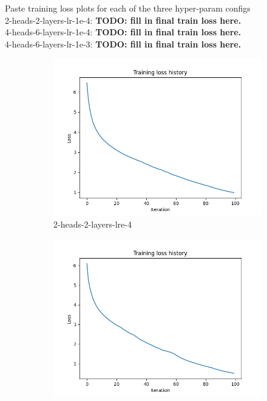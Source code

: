 \documentclass[11pt,addpoints,answers]{exam}
\begin{document}
\begin{questions}
\question Paste training loss plots for each of the three hyper-param configs
\\
2-heads-2-layers-lr-1e-4: \textbf{TODO: fill in final train loss here.} \\
4-heads-6-layers-lr-1e-4: \textbf{TODO: fill in final train loss here.} \\
4-heads-6-layers-lr-1e-3: \textbf{TODO: fill in final train loss here.} 
\begin{figure}[H]
    \centering
    \begin{subfigure}[b]{0.32\linewidth}
        \includegraphics[width=\linewidth]{case1_loss_out.png}
        \caption{2-heads-2-layers-lre-4}
    \end{subfigure}
    \begin{subfigure}[b]{0.32\linewidth}
        \includegraphics[width=\linewidth]{case2_loss_out.png}

\end{subfigure}
\end{figure}
\end{questions}
\end{document}
